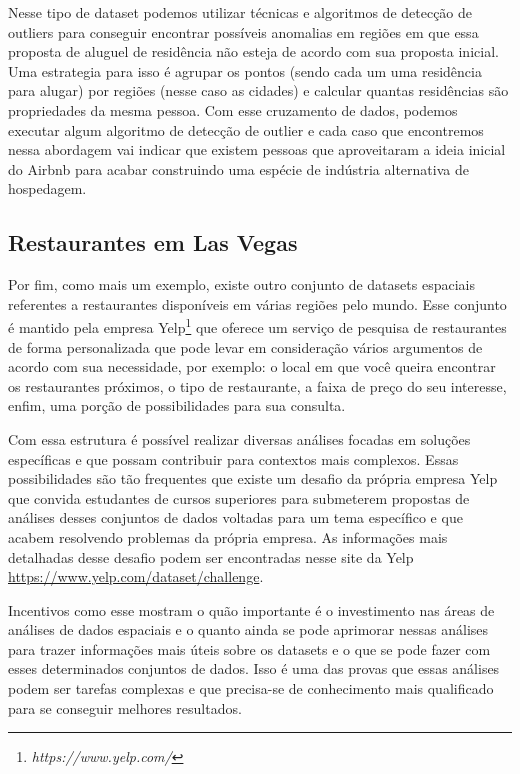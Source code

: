 Nesse tipo de dataset podemos utilizar técnicas e algoritmos de detecção de outliers para conseguir encontrar possíveis anomalias em regiões em que essa proposta de aluguel de residência não esteja de acordo com sua proposta inicial. Uma estrategia para isso é agrupar os pontos (sendo cada um uma residência para alugar) por regiões (nesse caso as cidades) e calcular quantas residências são propriedades da mesma pessoa. Com esse cruzamento de dados, podemos executar algum algoritmo de detecção de outlier e cada caso que encontremos nessa abordagem vai indicar que existem pessoas que aproveitaram a ideia inicial do Airbnb para acabar construindo uma espécie de indústria alternativa de hospedagem.

\subsection{Restaurantes em Las Vegas}

Por fim, como mais um exemplo, existe outro conjunto de datasets espaciais referentes a restaurantes disponíveis em várias regiões pelo mundo. Esse conjunto é mantido pela empresa Yelp\footnote{\it https://www.yelp.com/} que oferece um serviço de pesquisa de restaurantes de forma personalizada que pode levar em consideração vários argumentos de acordo com sua necessidade, por exemplo: o local em que você queira encontrar os restaurantes próximos, o tipo de restaurante, a faixa de preço do seu interesse, enfim, uma porção de possibilidades para sua consulta.

Com essa estrutura é possível realizar diversas análises focadas em soluções específicas e que possam contribuir para contextos mais complexos. Essas possibilidades são tão frequentes que existe um desafio da própria empresa Yelp que convida estudantes de cursos superiores para submeterem propostas de análises desses conjuntos de dados voltadas para um tema específico e que acabem resolvendo problemas da própria empresa. As informações mais detalhadas desse desafio podem ser encontradas nesse site da Yelp \url{https://www.yelp.com/dataset/challenge}.

Incentivos como esse mostram o quão importante é o investimento nas áreas de análises de dados espaciais e o quanto ainda se pode aprimorar nessas análises para trazer informações mais úteis sobre os datasets e o que se pode fazer com esses determinados conjuntos de dados. Isso é uma das provas que essas análises podem ser tarefas complexas e que precisa-se de conhecimento mais qualificado para se conseguir melhores resultados.

